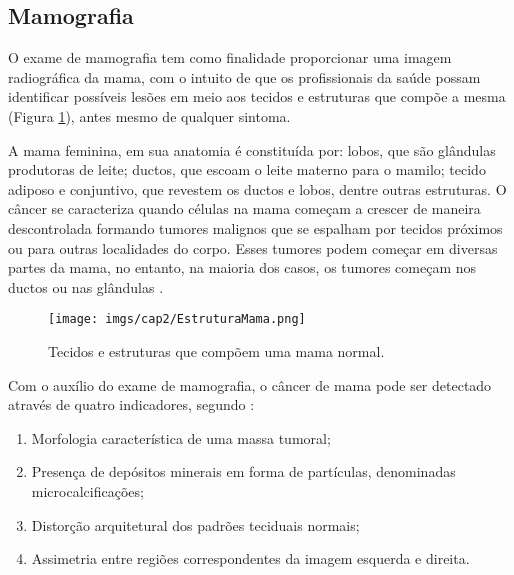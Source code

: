 \subsection{Mamografia}

O exame de mamografia tem como finalidade proporcionar uma imagem radiográfica da mama, com o intuito de que os profissionais da saúde possam identificar possíveis lesões em meio aos tecidos e estruturas que compõe a mesma (Figura \ref{fig:imgCap2EstruturaMama}), antes mesmo de qualquer sintoma. 

A mama feminina, em sua anatomia é constituída por: lobos, que são glândulas produtoras de leite; ductos, que escoam o leite materno para o mamilo; tecido adiposo e conjuntivo, que revestem os ductos e lobos, dentre outras estruturas. O câncer se caracteriza quando células na mama começam a crescer de maneira descontrolada formando tumores malignos que se espalham por tecidos próximos ou para outras localidades do corpo. Esses tumores podem começar em diversas partes da mama, no entanto, na maioria dos casos, os tumores começam nos ductos ou nas glândulas \cite{americancancersociety2017}.      

\begin{figure}[h]
	\caption{Tecidos e estruturas que compõem uma mama normal.}
	\begin{center}
		\texttt{[image: imgs/cap2/EstruturaMama.png]}
	\end{center}
	\label{fig:imgCap2EstruturaMama}
\end{figure}


Com o auxílio do exame de mamografia, o câncer de mama pode ser detectado através de quatro indicadores, segundo :

\begin{enumerate}
	\item Morfologia característica de uma massa tumoral;
	\item Presença de depósitos minerais em forma de partículas, denominadas microcalcificações;
	\item Distorção arquitetural dos padrões teciduais normais;
	\item Assimetria entre regiões correspondentes da imagem esquerda e direita.
\end{enumerate}

